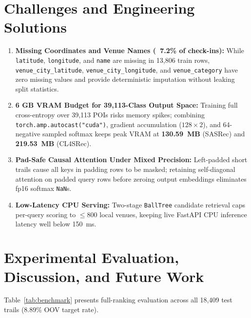 \documentclass[11pt,a4paper]{article}
\begin{document}
\section{Challenges and Engineering Solutions}
\begin{enumerate}
  \item \textbf{Missing Coordinates and Venue Names (~7.2\% of check-ins):} While \texttt{latitude}, \texttt{longitude}, and \texttt{name} are missing in 13,806 train rows, \texttt{venue\_city\_latitude}, \texttt{venue\_city\_longitude}, and \texttt{venue\_category} have zero missing values and provide deterministic imputation without leaking split statistics.
  \item \textbf{6 GB VRAM Budget for 39,113-Class Output Space:} Training full cross-entropy over 39,113 POIs risks memory spikes; combining \texttt{torch.amp.autocast("cuda")}, gradient accumulation ($128 \times 2$), and 64-negative sampled softmax keeps peak VRAM at \textbf{130.59~MB} (SASRec) and \textbf{219.53~MB} (CL4SRec).
  \item \textbf{Pad-Safe Causal Attention Under Mixed Precision:} Left-padded short trails cause all keys in padding rows to be masked; retaining self-diagonal attention on padded query rows before zeroing output embeddings eliminates fp16 softmax \texttt{NaN}s.
  \item \textbf{Low-Latency CPU Serving:} Two-stage \texttt{BallTree} candidate retrieval caps per-query scoring to $\le 800$ local venues, keeping live FastAPI CPU inference latency well below 150~ms.
\end{enumerate}

\section{Experimental Evaluation, Discussion, and Future Work}
Table~\ref{tab:benchmark} presents full-ranking evaluation across all 18,409 test trails (8.89\% OOV target rate).
\end{document}
